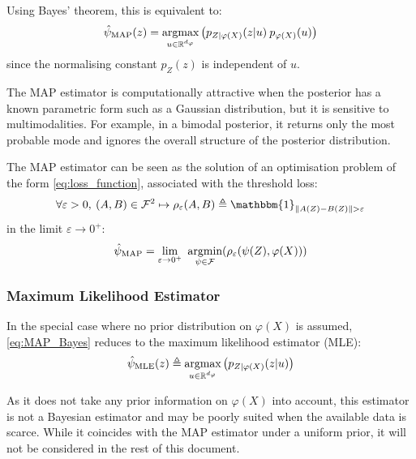 Using Bayes' theorem, this is equivalent to:
\begin{equation}
	\hat{\psi}_{\textup{MAP}}(z)=\underset{u\in\mathbb{R}^{d_{\varphi}}}{\textup{argmax}}\left(p_{Z|\varphi(X)}(z|u)\:p_{\varphi(X)}(u)\right)\label{eq:MAP_Bayes}
\end{equation}
since the normalising constant $p_Z(z)$ is independent of $u$.

The MAP estimator is computationally attractive when the posterior has a known parametric form such as a Gaussian distribution, but it is sensitive to multimodalities. For example, in a bimodal posterior, it returns only the most probable mode and ignores the overall structure of the posterior distribution.

\begin{remark}
	The MAP estimator can be seen as the solution of an optimisation problem of the form \eqref{eq:loss_function}, associated with the threshold loss:
	\begin{equation}
		\forall\varepsilon>0,\:(A,B)\in\mathcal{F}^2\mapsto\rho_\varepsilon(A,B)\triangleq\mathbbm{1}_{\|A(Z)-B(Z)\|>\varepsilon}
	\end{equation}
	in the limit $\varepsilon\to0^+$:
	\begin{equation}
		\hat{\psi}_{\textup{MAP}}=\lim_{\varepsilon\to0^+}\ \underset{\psi\in\mathcal{F}}{\textup{argmin}}(\rho_\varepsilon(\psi(Z),\varphi(X)))
	\end{equation}
\end{remark}

\subsubsection{Maximum Likelihood Estimator}

In the special case where no prior distribution on $\varphi(X)$ is assumed, \eqref{eq:MAP_Bayes} reduces to the maximum likelihood estimator (MLE):
\begin{equation}
	\hat{\psi}_{\textup{MLE}}(z)\triangleq\underset{u\in\mathbb{R}^{d_{\varphi}}}{\textup{argmax}}\left(p_{Z|\varphi(X)}(z|u)\right)
\end{equation}

As it does not take any prior information on $\varphi(X)$ into account, this estimator is not a Bayesian estimator and may be poorly suited when the available data is scarce. While it coincides with the MAP estimator under a uniform prior, it will not be considered in the rest of this document.

